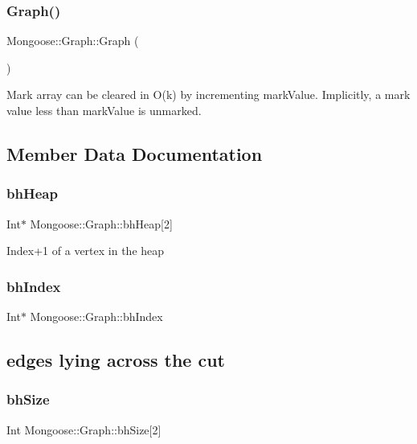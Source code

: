 \subsubsection{\texorpdfstring{Graph()}{Graph()}}
{\footnotesize\ttfamily Mongoose\+::\+Graph\+::\+Graph (\begin{DoxyParamCaption}{ }\end{DoxyParamCaption})}

Mark array can be cleared in O(k) by incrementing mark\+Value. Implicitly, a mark value less than mark\+Value is unmarked. 

\subsection{Member Data Documentation}
\hypertarget{class_mongoose_1_1_graph_a8fb629455d09b3dc44da3724aeb2dde9}{}\label{class_mongoose_1_1_graph_a8fb629455d09b3dc44da3724aeb2dde9} 
\subsubsection{\texorpdfstring{bh\+Heap}{bhHeap}}
{\footnotesize\ttfamily Int$\ast$ Mongoose\+::\+Graph\+::bh\+Heap\mbox{[}2\mbox{]}}

Index+1 of a vertex in the heap \hypertarget{class_mongoose_1_1_graph_af86e4a4881a318cdad331d8249f36e7a}{}\label{class_mongoose_1_1_graph_af86e4a4881a318cdad331d8249f36e7a} 
\subsubsection{\texorpdfstring{bh\+Index}{bhIndex}}
{\footnotesize\ttfamily Int$\ast$ Mongoose\+::\+Graph\+::bh\+Index}

\subsection*{edges lying across the cut}\hypertarget{class_mongoose_1_1_graph_aafe78f0432fa8964d9890e151094b6fc}{}\label{class_mongoose_1_1_graph_aafe78f0432fa8964d9890e151094b6fc} 
\subsubsection{\texorpdfstring{bh\+Size}{bhSize}}
{\footnotesize\ttfamily Int Mongoose\+::\+Graph\+::bh\+Size\mbox{[}2\mbox{]}}

